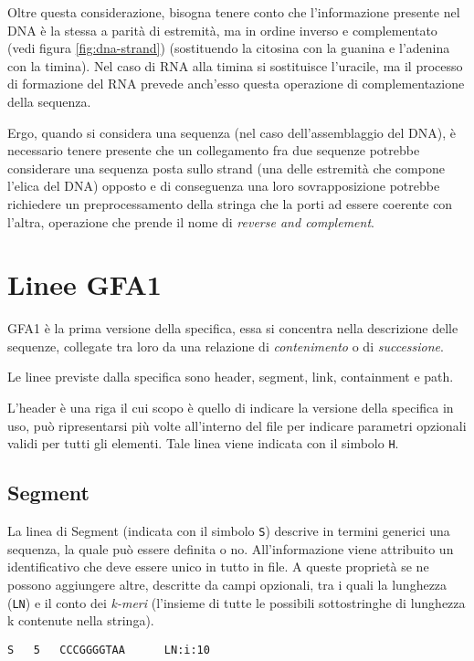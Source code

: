 Oltre questa considerazione, bisogna tenere conto che
l'informazione presente nel DNA
è la stessa a parità di estremità, ma in ordine inverso e
complementato (vedi figura \ref{fig:dna-strand}) (sostituendo
la citosina con la guanina e
l'adenina con la timina). Nel caso di RNA alla timina
si sostituisce l'uracile, ma il processo di formazione del RNA
prevede anch'esso questa operazione di complementazione
della sequenza.

Ergo, quando si considera una sequenza (nel caso
dell'assemblaggio del DNA), è necessario tenere presente
che un collegamento fra due sequenze potrebbe considerare
una sequenza posta sullo strand (una delle estremità
che compone l'elica del DNA) opposto e di conseguenza una loro
sovrapposizione potrebbe richiedere un preprocessamento della
stringa che la porti ad essere coerente con l'altra, operazione
che prende il nome di \emph{reverse and complement}.

\section{Linee GFA1}
GFA1 è la prima versione della specifica, essa si concentra nella descrizione
delle sequenze, collegate tra loro da una relazione di \emph{contenimento}
o di \emph{successione}.

Le linee previste dalla specifica sono header, segment, link, containment
e path.

L'header è una riga il cui scopo è quello di indicare la versione della specifica
in uso, può ripresentarsi più volte all'interno del file per indicare parametri
opzionali validi per tutti gli elementi. Tale linea viene indicata con il simbolo \texttt{H}.

\subsection{Segment}
La linea di Segment (indicata con il simbolo \texttt{S}) descrive in termini
generici una sequenza, la quale può essere definita o no. All'informazione
viene attribuito un identificativo che deve essere unico in tutto in file.
A queste proprietà se ne possono aggiungere altre, descritte da campi
opzionali, tra i quali la lunghezza (\texttt{LN}) e
il conto dei \emph{k-meri} (l'insieme di tutte le possibili sottostringhe
di lunghezza k contenute nella stringa).

\begin{lstlisting}[basicstyle=\ttfamily, caption=Una possibile Segment line.]
S	5	CCCGGGGTAA		LN:i:10
\end{lstlisting}

